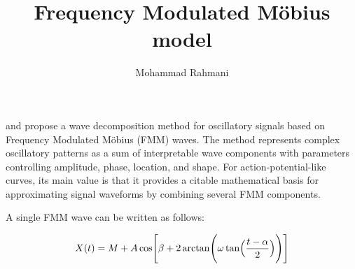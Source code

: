\documentclass[a4paper]{article}
\title{Frequency Modulated M\"obius model}
\date{}
\author{Mohammad Rahmani}
\begin{document}
   \maketitle


   \cite{rueda-2021-a-novel-wave-decomposition-for-oscillatory-signals}
   and
   \cite{rodriguez-collado-2021-identification-of-action-potential-waveforms}
   propose a wave decomposition method for oscillatory signals based on Frequency Modulated M\"obius (FMM) waves.
   The method represents complex oscillatory patterns as a sum of interpretable wave components with parameters controlling amplitude, phase, location, and shape.
   For action-potential-like curves, its main value is that it provides a citable mathematical basis for approximating signal waveforms by combining several FMM components.

   A single FMM wave can be written as follows:

   \begin{equation}
      X(t)
      =
      M
      +
      A
      \cos
      \Biggl[
      \beta
      +
      2
      \arctan
      \Biggl(
      \omega
      \tan
      \Bigl(
      \frac{t-\alpha}{2}
      \Bigr)
      \Biggr)
      \Biggr]
   \end{equation}
\end{document}
